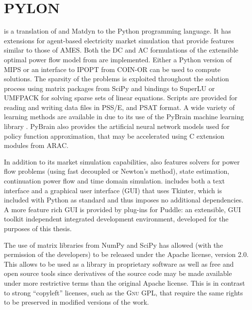 \section{PYLON}
\label{sec:pylon}

\pylon is a translation of \matpower and Matdyn to the Python programming
language.  It has extensions for agent-based electricity market simulation that
provide features similar to those of AMES.  Both the DC and AC formulations of
the extensible optimal power flow model \cite{zimmerman:mp_pes} from \matpower
are implemented.  Either a Python version of MIPS or an interface to IPOPT from
COIN-OR can be used to compute solutions.  The sparsity of the problems is
exploited throughout the solution process using matrix packages from SciPy and
bindings to SuperLU or UMFPACK for solving sparse sets of linear equations.
Scripts are provided for reading and writing data files in PSS/E, \matpower and
PSAT format. A wide variety of learning methods are available in \pylon due to
its use of the PyBrain machine learning library \cite{schaul:2010}.  PyBrain
also provides the artificial neural network models used for policy function
approximation, that may be accelerated using C extension modules from ARAC.

In addition to its market simulation capabilities, \pylon also features solvers
for power flow problems (using fast decoupled or Newton's method), state
estimation, continuation power flow and time domain simulation.  \pylon includes
both a text interface and a graphical user interface (GUI) that uses Tkinter,
which is included with Python as standard and thus imposes no additional
dependencies.  A more feature rich GUI is provided by plug-ins for Puddle:
an extensible, GUI toolkit independent integrated development environment,
developed for the purposes of this thesis.

The use of matrix
libraries from NumPy and SciPy has allowed \pylon (with the permission of the
\matpower developers) to be released under the Apache license, version 2.0. This
allows \pylon to be used as a library in proprietary software as well as
free and open source tools since derivatives of the source code may be made
available under more restrictive terms than the original Apache license.  This
is in contrast to strong ``copyleft'' licenses, such as the \textsc{Gnu} GPL,
that require the same rights to be preserved in modified versions of the work.

